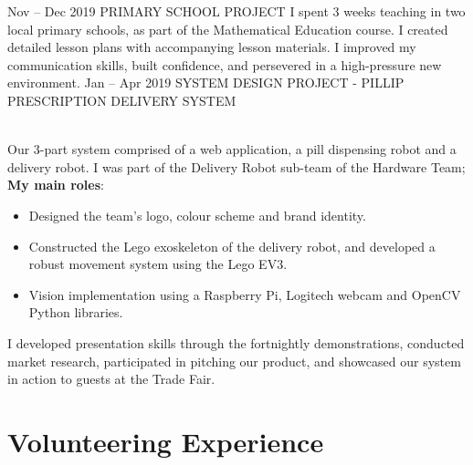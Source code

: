 \documentclass[]{cv-style}          %
\begin{document}
\begin{entrylist}
\entry
  {Nov -- Dec 2019}
  {PRIMARY SCHOOL PROJECT}
  {}
  {I spent 3 weeks teaching in two local primary schools, as part of the Mathematical Education course. I created detailed lesson plans with accompanying lesson materials. I improved my communication skills, built confidence, and persevered in a high-pressure new environment.}
\entry
  {Jan -- Apr 2019}
  {SYSTEM DESIGN PROJECT - PILLIP PRESCRIPTION DELIVERY SYSTEM}
  {}
  {\\
  Our 3-part system comprised of a web application, a pill dispensing robot and a delivery robot. I was part of the Delivery Robot sub-team of the Hardware Team; \\
  \textbf{My main roles}:
  \begin{itemize}
      \item Designed the team's logo, colour scheme and brand identity.
      \item Constructed the Lego exoskeleton of the delivery robot, and developed a robust movement system using the Lego EV3.
      \item Vision implementation using a Raspberry Pi, Logitech webcam and OpenCV Python libraries.
  \end{itemize}
  I developed presentation skills through the fortnightly demonstrations, conducted market research, participated in pitching our product, and showcased our system in action to guests at the Trade Fair.}
\end{entrylist}

\clearpage

\begin{aside}
\end{aside}

\section{Volunteering Experience}
\end{document}
